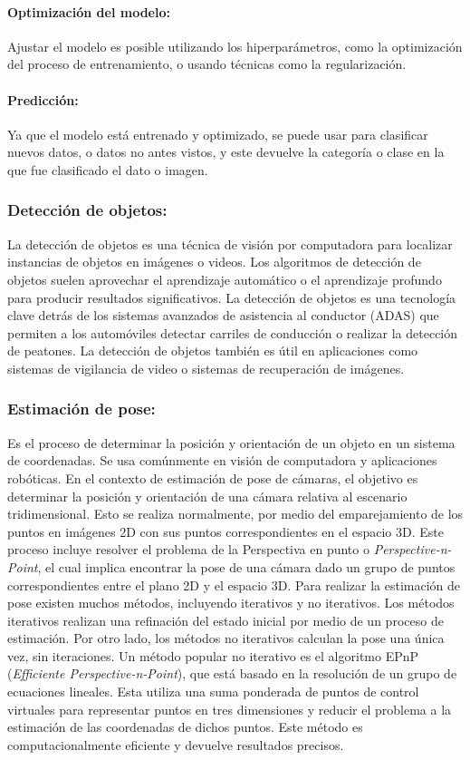 \paragraph*{Optimización del modelo:}
Ajustar el modelo es posible utilizando los hiperparámetros, como la optimización del proceso de entrenamiento, o usando técnicas como la regularización.\cite{Krizhevsky}
\paragraph*{Predicción:}
Ya que el modelo está entrenado y optimizado, se puede usar para clasificar nuevos datos, o datos no antes vistos, y este devuelve la categoría o clase en la que fue clasificado el dato o imagen. \cite{Krizhevsky}

\subsubsection*{Detección de objetos:}
La detección de objetos es una técnica de visión por computadora para localizar instancias de objetos en imágenes o videos. Los algoritmos de detección de objetos suelen aprovechar el aprendizaje automático o el aprendizaje profundo para producir resultados significativos. La detección de objetos es una tecnología clave detrás de los sistemas avanzados de asistencia al conductor (ADAS) que permiten a los automóviles detectar carriles de conducción o realizar la detección de peatones. La detección de objetos también es útil en aplicaciones como sistemas de vigilancia de video o sistemas de recuperación de imágenes. \cite{MATHOD}

\subsubsection*{Estimación de pose:}
Es el proceso de determinar la posición y orientación de un objeto en un sistema de coordenadas. Se usa comúnmente en visión de computadora y aplicaciones robóticas. En el contexto de estimación de pose de cámaras, el objetivo es determinar la posición y orientación de una cámara relativa al escenario tridimensional. Esto se realiza normalmente, por medio del emparejamiento de los puntos en imágenes 2D con sus puntos correspondientes en el espacio 3D. Este proceso incluye resolver el problema de la Perspectiva en punto o \textit{Perspective-n-Point}, el cual implica encontrar la pose de una cámara dado un grupo de puntos correspondientes entre el plano 2D y el espacio 3D. Para realizar la estimación de pose existen muchos métodos, incluyendo iterativos y no iterativos. Los métodos iterativos realizan una refinación del estado inicial por medio de un proceso de estimación. Por otro lado, los métodos no iterativos calculan la pose una única vez, sin iteraciones. Un método popular no iterativo es el algoritmo EPnP (\textit{Efficiente Perspective-n-Point}), que está basado en la resolución de un grupo de ecuaciones lineales. Esta utiliza una suma ponderada de puntos de control virtuales para representar puntos en tres dimensiones y reducir el problema a la estimación de las coordenadas de dichos puntos. Este método es computacionalmente eficiente y devuelve resultados precisos. \cite{3dpose1}

